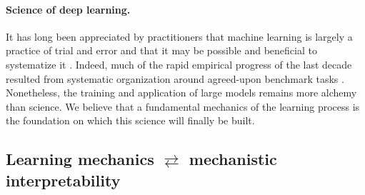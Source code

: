 \paragraph{Science of deep learning.}
It has long been appreciated by practitioners that machine learning is largely a practice of trial and error and that it may be possible and beneficial to systematize it \citep{langley1988machine,gal2015science,rahimi2017nips_test_of_time,baraniuk2020science}.
Indeed, much of the rapid empirical progress of the last decade resulted from systematic organization around agreed-upon benchmark tasks \citep{donoho2024data}.
Nonetheless, the training and application of large models remains more alchemy than science.
We believe that a fundamental mechanics of the learning process is the foundation on which this science will finally be built.






\subsection{\texorpdfstring{Learning mechanics $\rightleftarrows$ mechanistic interpretability}{Learning mechanics <-> mechanistic interpretability}}
\label{subsec:learning_mech_and_mechinterp}

